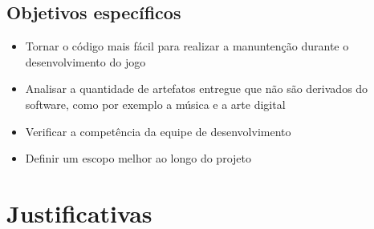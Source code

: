 \subsection{Objetivos específicos}
	\begin{itemize}
		\item Tornar o código mais fácil para realizar a manuntenção durante o desenvolvimento do jogo
		\item Analisar a quantidade de artefatos entregue que não são derivados do software, como por exemplo a música e a arte digital
		\item Verificar a competência da equipe de desenvolvimento
		\item Definir um escopo melhor ao longo do projeto
	\end{itemize}

\section{Justificativas}
  
